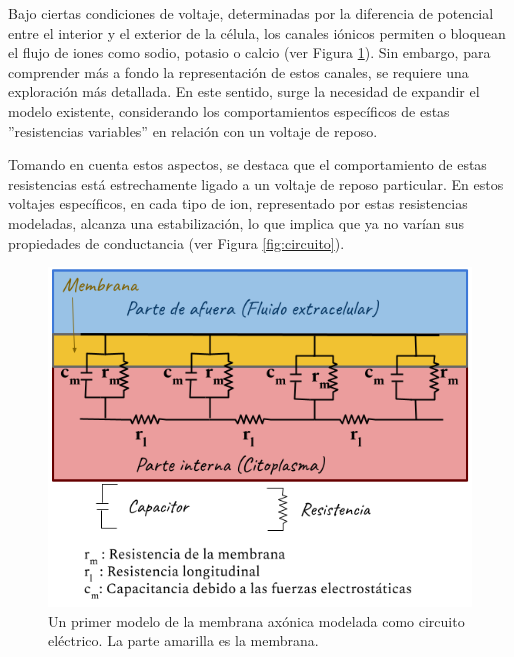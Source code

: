 Bajo ciertas condiciones de voltaje, determinadas por la diferencia de potencial entre el interior y el exterior de la célula, los canales iónicos permiten o bloquean el flujo de iones como sodio, potasio o calcio (ver Figura \ref{fig:ModelHh}). Sin embargo, para comprender más a fondo la representación de estos canales, se requiere una exploración más detallada. En este sentido, surge la necesidad de expandir el modelo existente, considerando los comportamientos específicos de estas ''resistencias variables'' en relación con un voltaje de reposo.

Tomando en cuenta estos aspectos, se destaca que el comportamiento de estas resistencias está estrechamente ligado a un voltaje de reposo particular. En estos voltajes específicos, en cada tipo de ion, representado por estas resistencias modeladas, alcanza una estabilización, lo que implica que ya no varían sus propiedades de conductancia (ver Figura \ref{fig:circuito}).

\begin{figure}[h]
 \centering
 \includegraphics[scale=0.5]{../Figuras/ModeloHH.2}
 \caption{Un primer modelo de la membrana axónica modelada como circuito eléctrico. La parte amarilla es la membrana.}
 \label{fig:ModelHh}
\end{figure}



